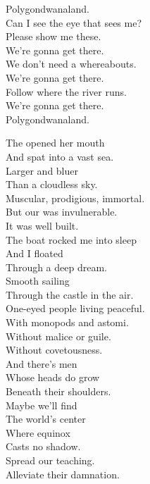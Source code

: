 Polygondwanaland. \\
Can I see the eye that sees me? \\
Please show me these. \\

We're gonna get there. \\
We don't need a whereabouts. \\
We're gonna get there. \\
Follow where the river runs. \\
We're gonna get there. \\
Polygondwanaland. \\




The  opened her mouth \\
And spat into a vast sea. \\
Larger and bluer \\
Than a cloudless sky. \\
Muscular, prodigious, immortal. \\
But our  was invulnerable. \\
It was well built. \\
The boat rocked me into sleep \\
And I floated \\
Through a deep dream. \\
Smooth sailing \\
Through the castle in the air. \\

One-eyed people living peaceful. \\
With monopods and astomi. \\
Without malice or guile. \\
Without covetousness. \\

And there's men \\
Whose heads do grow \\
Beneath their shoulders. \\
Maybe we'll find \\
The world's center \\
Where equinox \\
Casts no shadow. \\
Spread our teaching. \\
Alleviate their damnation. \\

